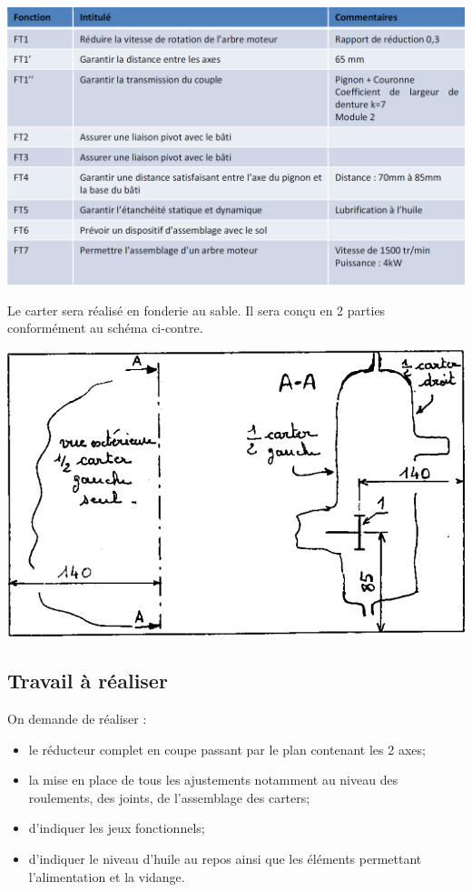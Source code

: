 \documentclass[11pt,oneside]{article}
\begin{document}
\begin{center}
\includegraphics[width=.9\textwidth]{png/img5}
\end{center}



\begin{minipage}[c]{.47\linewidth}

Le carter sera réalisé en fonderie au sable. Il sera conçu en 2 parties conformément au schéma ci-contre.
\end{minipage}\hfill
\begin{minipage}[c]{.47\linewidth}
\begin{center}
\includegraphics[width=.85\textwidth]{png/img6}
\end{center}

\end{minipage}

\subsection*{Travail à réaliser}
On demande de réaliser : 
\begin{itemize}
\item le réducteur complet en coupe passant par le plan contenant les 2 axes; 
\item la mise en place de tous les ajustements notamment au niveau des roulements, des joints, de l'assemblage des carters;
\item d'indiquer les jeux fonctionnels;
\item d'indiquer le niveau d'huile au repos ainsi que les éléments permettant l'alimentation et la vidange. 
\end{itemize}
\end{document}
